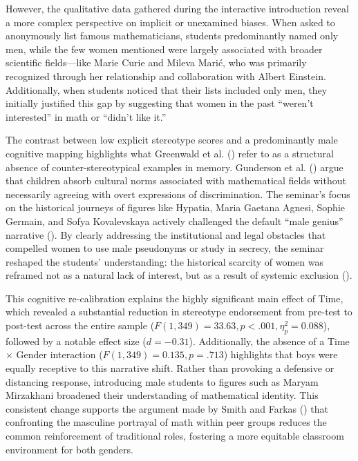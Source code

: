 However, the qualitative data gathered during the interactive introduction reveal a more complex perspective on implicit or unexamined biases. When asked to anonymously list famous mathematicians, students predominantly named only men, while the few women mentioned were largely associated with broader scientific fields—like Marie Curie and Mileva Marić, who was primarily recognized through her relationship and collaboration with Albert Einstein. Additionally, when students noticed that their lists included only men, they initially justified this gap by suggesting that women in the past ``weren't interested'' in math or ``didn't like it.''

The contrast between low explicit stereotype scores and a predominantly male cognitive mapping highlights what Greenwald et al. (\citeyear{Greenwald2002}) refer to as a structural absence of counter-stereotypical examples in memory. Gunderson et al. (\citeyear{Gunderson2012}) argue that children absorb cultural norms associated with mathematical fields without necessarily agreeing with overt expressions of discrimination. The seminar's focus on the historical journeys of figures like Hypatia, Maria Gaetana Agnesi, Sophie Germain, and Sofya Kovalevskaya actively challenged the default ``male genius'' narrative (\cite{Leslie2015}). By clearly addressing the institutional and legal obstacles that compelled women to use male pseudonyms or study in secrecy, the seminar reshaped the students' understanding: the historical scarcity of women was reframed not as a natural lack of interest, but as a result of systemic exclusion (\cite{Cheryan2015}).

This cognitive re-calibration explains the highly significant main effect of Time, which revealed a substantial reduction in stereotype endorsement from pre-test to post-test across the entire sample ($F(1, 349) = 33.63, p < .001, \eta_p^2 = 0.088$), followed by a notable effect size ($d = -0.31$).
Additionally, the absence of a Time $\times$ Gender interaction ($F(1, 349) = 0.135, p = .713$) highlights that boys were equally receptive to this narrative shift.
Rather than provoking a defensive or distancing response, introducing male students to figures such as Maryam Mirzakhani broadened their understanding of mathematical identity. This consistent change supports the argument made by Smith and Farkas (\citeyear{Smith2023}) that confronting the masculine portrayal of math within peer groups reduces the common reinforcement of traditional roles, fostering a more equitable classroom environment for both genders.

